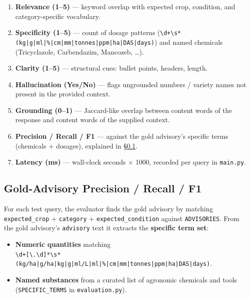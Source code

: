 \documentclass[11pt,a4paper]{article}
\begin{document}
\begin{enumerate}[leftmargin=*]
  \item \textbf{Relevance (1--5)} --- keyword overlap with expected
        crop, condition, and category-specific vocabulary.
  \item \textbf{Specificity (1--5)} --- count of dosage patterns
        (\texttt{\textbackslash d+\textbackslash s*(kg|g|ml|\%|cm|mm|tonnes|ppm|ha|DAS|days)})
        and named chemicals (Tricyclazole, Carbendazim, Mancozeb,
        \ldots).
  \item \textbf{Clarity (1--5)} --- structural cues: bullet points,
        headers, length.
  \item \textbf{Hallucination (Yes/No)} --- flags ungrounded numbers
        / variety names not present in the provided context.
  \item \textbf{Grounding (0--1)} --- Jaccard-like overlap between
        content words of the response and content words of the
        supplied context.
  \item \textbf{Precision / Recall / F1} --- against the gold
        advisory's specific terms (chemicals + dosages), explained
        in \S\ref{sec:pr-f1}.
  \item \textbf{Latency (ms)} --- wall-clock seconds $\times$ 1000,
        recorded per query in \texttt{main.py}.
\end{enumerate}

\subsection{Gold-Advisory Precision / Recall / F1}\label{sec:pr-f1}
For each test query, the evaluator finds the gold advisory by
matching \texttt{expected\_crop} + \texttt{category} +
\texttt{expected\_condition} against \texttt{ADVISORIES}. From the
gold advisory's \texttt{advisory} text it extracts the
\textbf{specific term set}:

\begin{itemize}[leftmargin=*]
  \item \textbf{Numeric quantities} matching
        \\
        \texttt{\textbackslash d+[\textbackslash.\textbackslash d]*\textbackslash s*(kg/ha|g/ha|kg|g|ml/L|ml|\%|cm|mm|tonnes|ppm|ha|DAS|days)}.
  \item \textbf{Named substances} from a curated list of agronomic
        chemicals and tools (\texttt{SPECIFIC\_TERMS} in
        \texttt{evaluation.py}).
\end{itemize}
\end{document}
